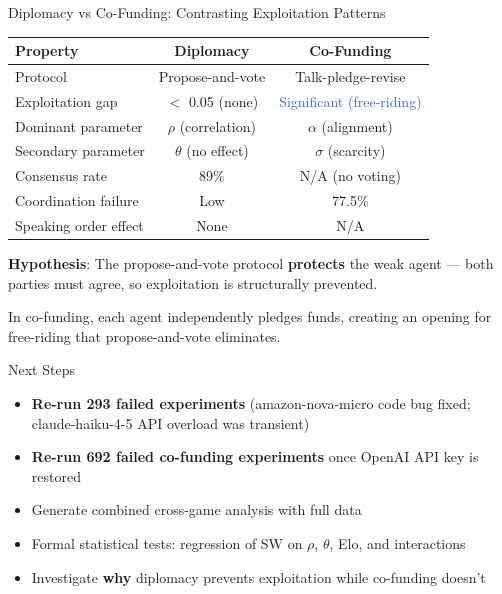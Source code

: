 \documentclass[aspectratio=169]{beamer}
\begin{document}
\begin{frame}{Diplomacy vs Co-Funding: Contrasting Exploitation Patterns}
\begin{center}
\begin{tabular}{lcc}
\toprule
Property & Diplomacy & Co-Funding \\
\midrule
Protocol & Propose-and-vote & Talk-pledge-revise \\
Exploitation gap & \textcolor{good}{$<$ 0.05 (none)} & \textcolor{highlight}{Significant (free-riding)} \\
Dominant parameter & $\rho$ (correlation) & $\alpha$ (alignment) \\
Secondary parameter & $\theta$ (no effect) & $\sigma$ (scarcity) \\
Consensus rate & 89\% & N/A (no voting) \\
Coordination failure & Low & 77.5\% \\
Speaking order effect & None & N/A \\
\bottomrule
\end{tabular}
\end{center}

\vspace{0.3cm}
\textbf{Hypothesis}: The propose-and-vote protocol \textbf{protects} the weak agent ---
both parties must agree, so exploitation is structurally prevented.

In co-funding, each agent independently pledges funds, creating an opening for free-riding that propose-and-vote eliminates.
\end{frame}

\begin{frame}{Next Steps}
\begin{itemize}
    \item \textbf{Re-run 293 failed experiments} (amazon-nova-micro code bug fixed; claude-haiku-4-5 API overload was transient)
    \item \textbf{Re-run 692 failed co-funding experiments} once OpenAI API key is restored
    \item Generate combined cross-game analysis with full data
    \item Formal statistical tests: regression of SW on $\rho$, $\theta$, Elo, and interactions
    \item Investigate \textbf{why} diplomacy prevents exploitation while co-funding doesn't
\end{itemize}
\end{frame}
\end{document}
